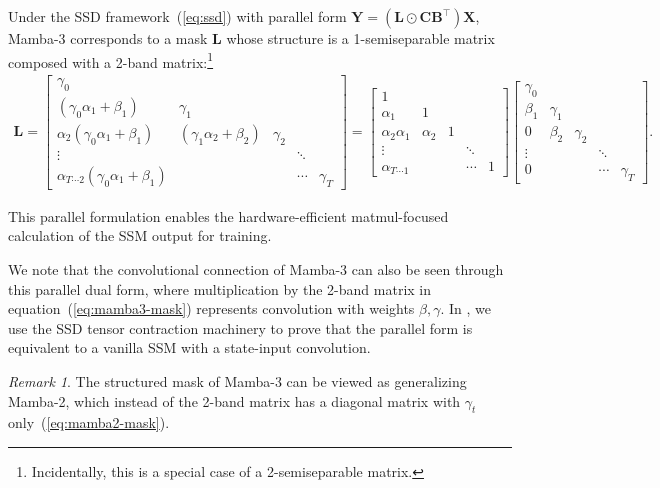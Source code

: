 \documentclass{article}
\def\eqref#1{equation~(\ref{#1})}
\def\plaineqref#1{(\ref{#1})}
\def\bB{{\bm{B}}}
\def\bC{{\bm{C}}}
\def\bL{{\bm{L}}}
\def\bX{{\bm{X}}}
\def\bY{{\bm{Y}}}
\theoremstyle{plain}
\theoremstyle{definition}
\theoremstyle{remark}
\newtheorem{remark}{Remark}
\begin{document}
Under the SSD framework~\plaineqref{eq:ssd} with parallel form $\bY = (\bL \odot \bC {\bB}^{\top})\bX$,
Mamba-3 corresponds to a mask $\bL$ whose structure is a 1-semiseparable matrix composed with a 2-band matrix:\footnote{Incidentally, this is a special case of a 2-semiseparable matrix.}
\begin{align}
\bL =
    \begin{bmatrix}
    \gamma_0 & & & \\
    (\gamma_0\alpha_1 + \beta_1) & \gamma_1 & & \\
    \alpha_2(\gamma_0\alpha_1 + \beta_1) & (\gamma_1\alpha_2+\beta_2) & \gamma_2 & \\
    \vdots & & & \ddots \\
    \alpha_{T\cdots 2}(\gamma_0\alpha_1 + \beta_1) & & & \cdots & \gamma_T
    \end{bmatrix} =
    \begin{bmatrix}
    1 & & & \\
    \alpha_1 & 1 & & \\
    \alpha_2\alpha_1 & \alpha_2 & 1 & \\
    \vdots & & & \ddots \\
    \alpha_{T\cdots 1} & & & \cdots & 1
    \end{bmatrix}
    \begin{bmatrix}
    \gamma_0 & & & \\
    \beta_1 & \gamma_1 & & \\
    0 & \beta_2 & \gamma_2 & \\
    \vdots & & & \ddots \\
    0 & & & \cdots & \gamma_T
    \end{bmatrix}.
    \label{eq:mamba3-mask}
\end{align}

This parallel formulation enables the hardware-efficient matmul-focused calculation of the SSM output for training. 

We note that the convolutional connection of Mamba-3 can also be seen through this parallel dual form, where multiplication by the 2-band matrix in \eqref{eq:mamba3-mask} represents convolution with weights $\beta, \gamma$.
In , we use the SSD tensor contraction machinery to prove that the parallel form is equivalent to a vanilla SSM with a state-input convolution.

\begin{remark}
    The structured mask of Mamba-3 can be viewed as generalizing Mamba-2, which instead of the 2-band matrix has a diagonal matrix with $\gamma_t$ only~\plaineqref{eq:mamba2-mask}.
\end{remark}
\end{document}
